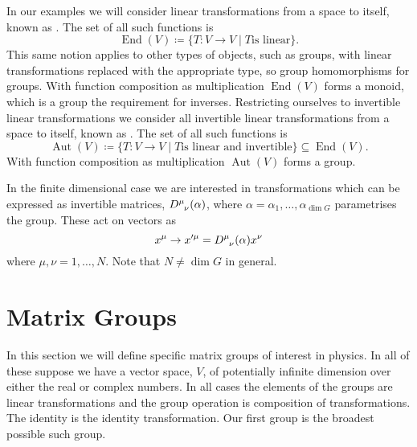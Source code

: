 \documentclass[fleqn]{NotesClass}
\DeclareMathOperator{\End}{End}
\DeclareMathOperator{\Aut}{Aut}
\begin{document}
    In our examples we will consider linear transformations from a space to itself, known as .
    The set of all such functions is
    \begin{equation}
        \End(V) \coloneqq \{T \colon V \to V \mid T \text{is linear}\}.
    \end{equation}
    This same notion applies to other types of objects, such as groups, with linear transformations replaced with the appropriate type, so group homomorphisms for groups.
    With function composition as multiplication \(\End(V)\) forms a monoid, which is a group the requirement for inverses.
    Restricting ourselves to invertible linear transformations we consider all invertible linear transformations from a space to itself, known as .
    The set of all such functions is
    \begin{equation}
        \Aut(V) \coloneqq \{T \colon V \to V \mid T \text{is linear and invertible}\} \subseteq \End(V).
    \end{equation}
    With function composition as multiplication \(\Aut(V)\) forms a group.
    
    In the finite dimensional case we are interested in transformations which can be expressed as invertible matrices, \(\tensor{D}{^\mu_\nu}(\alpha)\), where \(\alpha = \alpha_1, \dotsc, \alpha_{\dim G}\) parametrises the group.
    These act on vectors as
    \begin{equation}
        x^\mu \to x'^\mu = \tensor{D}{^\mu_\nu}(\alpha) x^\nu
    \end{equation}
    where \(\mu, \nu = 1, \dotsc, N\).
    Note that \(N \ne \dim G\) in general.
    
    \section{Matrix Groups}
    In this section we will define specific matrix groups of interest in physics.
    In all of these suppose we have a vector space, \(V\), of potentially infinite dimension over either the real or complex numbers.
    In all cases the elements of the groups are linear transformations and the group operation is composition of transformations.
    The identity is the identity transformation.
    Our first group is the broadest possible such group.
    
\end{document}
